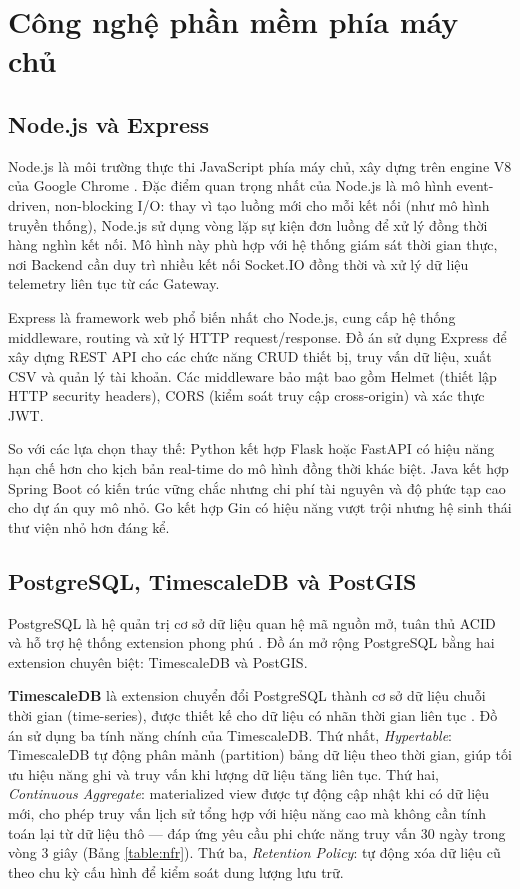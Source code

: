 \documentclass[../DoAn.tex]{subfiles}
\begin{document}
\section{Công nghệ phần mềm phía máy chủ}
\label{section:3.4}

\subsection{Node.js và Express}
\label{subsection:3.4.1}

Node.js là môi trường thực thi JavaScript phía máy chủ, xây dựng trên engine V8 của Google Chrome \cite{nodejs2024}. Đặc điểm quan trọng nhất của Node.js là mô hình event-driven, non-blocking I/O: thay vì tạo luồng mới cho mỗi kết nối (như mô hình truyền thống), Node.js sử dụng vòng lặp sự kiện đơn luồng để xử lý đồng thời hàng nghìn kết nối. Mô hình này phù hợp với hệ thống giám sát thời gian thực, nơi Backend cần duy trì nhiều kết nối Socket.IO đồng thời và xử lý dữ liệu telemetry liên tục từ các Gateway.

Express là framework web phổ biến nhất cho Node.js, cung cấp hệ thống middleware, routing và xử lý \gls{HTTP} request/response. Đồ án sử dụng Express để xây dựng \gls{REST} \gls{API} cho các chức năng \gls{CRUD} thiết bị, truy vấn dữ liệu, xuất CSV và quản lý tài khoản. Các middleware bảo mật bao gồm Helmet (thiết lập \gls{HTTP} security headers), CORS (kiểm soát truy cập cross-origin) và xác thực \gls{JWT}.

So với các lựa chọn thay thế: Python kết hợp Flask hoặc FastAPI có hiệu năng hạn chế hơn cho kịch bản real-time do mô hình đồng thời khác biệt. Java kết hợp Spring Boot có kiến trúc vững chắc nhưng chi phí tài nguyên và độ phức tạp cao cho dự án quy mô nhỏ. Go kết hợp Gin có hiệu năng vượt trội nhưng hệ sinh thái thư viện nhỏ hơn đáng kể.

\subsection{PostgreSQL, TimescaleDB và PostGIS}
\label{subsection:3.4.2}

PostgreSQL là hệ quản trị cơ sở dữ liệu quan hệ mã nguồn mở, tuân thủ ACID và hỗ trợ hệ thống extension phong phú \cite{postgresql2024}. Đồ án mở rộng PostgreSQL bằng hai extension chuyên biệt: TimescaleDB và PostGIS.

\textbf{TimescaleDB} là extension chuyển đổi PostgreSQL thành cơ sở dữ liệu chuỗi thời gian (time-series), được thiết kế cho dữ liệu có nhãn thời gian liên tục \cite{timescaledb2024}. Đồ án sử dụng ba tính năng chính của TimescaleDB. Thứ nhất, \textit{Hypertable}: TimescaleDB tự động phân mảnh (partition) bảng dữ liệu theo thời gian, giúp tối ưu hiệu năng ghi và truy vấn khi lượng dữ liệu tăng liên tục. Thứ hai, \textit{Continuous Aggregate}: materialized view được tự động cập nhật khi có dữ liệu mới, cho phép truy vấn lịch sử tổng hợp với hiệu năng cao mà không cần tính toán lại từ dữ liệu thô — đáp ứng yêu cầu phi chức năng truy vấn 30 ngày trong vòng 3 giây (Bảng \ref{table:nfr}). Thứ ba, \textit{Retention Policy}: tự động xóa dữ liệu cũ theo chu kỳ cấu hình để kiểm soát dung lượng lưu trữ.
\end{document}
